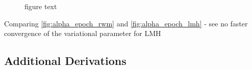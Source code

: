 \begin{figure}[!htb]
\qquad
{}
\caption{figure text}
\label{fig:alpha_epoch_lmh}
\end{figure}

Comparing \autoref{fig:alpha_epoch_rwm} and \autoref{fig:alpha_epoch_lmh} - see no faster convergence of the variational parameter for LMH


\FloatBarrier

\subsection{Additional Derivations}\label{app:additional_derivations}

